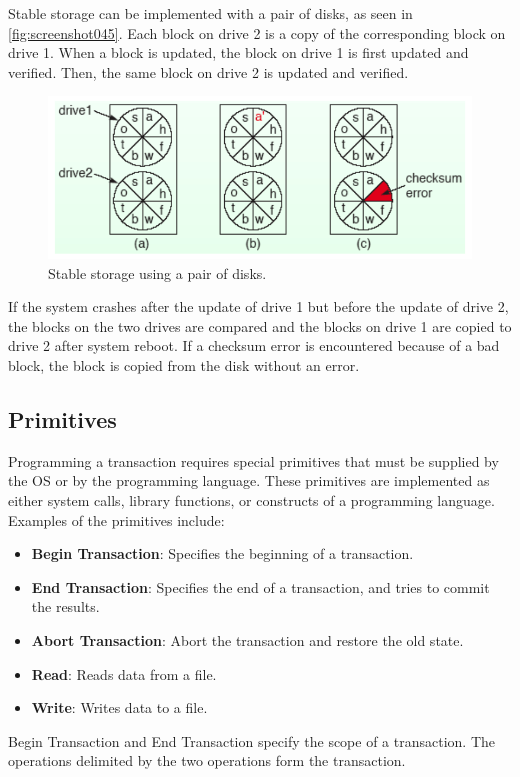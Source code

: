 Stable storage can be implemented with a pair of disks, as seen in \autoref{fig:screenshot045}. Each block on drive 2 is a copy of the corresponding block on drive 1. When a block is updated, the block on drive 1 is first updated and verified. Then, the same block on drive 2 is updated and verified. 

\begin{figure}
\centering
\includegraphics[width=0.7\linewidth]{screenshot045}
\caption{Stable storage using a pair of disks.}
\label{fig:screenshot045}
\end{figure}

If the system crashes after the update of drive 1 but before the update of drive 2, the blocks on the two drives are compared and the blocks on drive 1 are copied to drive 2 after system reboot. If a checksum error is encountered because of a bad block, the block is copied from the disk without an error. 

\subsection{Primitives}
Programming a transaction requires special primitives that must be supplied by the OS or by the programming language. These primitives are implemented as either system calls, library functions, or constructs of a programming language.  Examples of the primitives include: \begin{itemize}
\item \textbf{Begin Transaction}: Specifies the beginning of a transaction. 
\item \textbf{End Transaction}: Specifies the end of a transaction, and tries to commit the results. 
\item \textbf{Abort Transaction}: Abort the transaction and restore the old state.
\item \textbf{Read}: Reads data from a file. 
\item \textbf{Write}: Writes data to a file. 
\end{itemize}

Begin Transaction and End Transaction specify the scope of a transaction. The operations delimited by the two operations form the transaction. 

